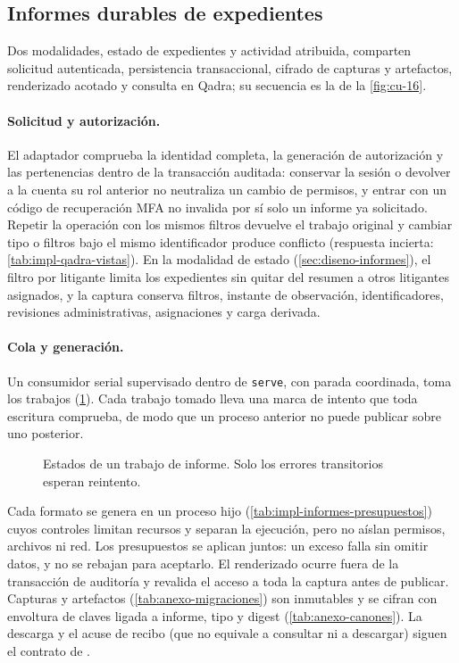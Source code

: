 \subsection{Informes durables de expedientes}\label{sec:impl-informes}

Dos modalidades, estado de expedientes y actividad atribuida, comparten
solicitud autenticada, persistencia transaccional, cifrado de capturas y
artefactos, renderizado acotado y consulta en Qadra; su secuencia es la de la
\cref{fig:cu-16}.

\paragraph{Solicitud y autorización.} El adaptador comprueba la identidad
completa, la generación de autorización y las pertenencias dentro de la
transacción auditada: conservar la sesión o devolver a la cuenta su rol anterior
no neutraliza un cambio de permisos, y entrar con un código de recuperación
MFA no invalida por sí solo un informe ya solicitado. Repetir la operación
con los mismos filtros devuelve el trabajo original y cambiar tipo o filtros
bajo el mismo identificador produce conflicto (respuesta incierta: \cref{tab:impl-qadra-vistas}). En la modalidad de estado
(\cref{sec:diseno-informes}), el filtro por litigante limita los expedientes sin
quitar del resumen a otros litigantes asignados, y la captura conserva filtros,
instante de observación, identificadores, revisiones administrativas,
asignaciones y carga derivada.

\paragraph{Cola y generación.} Un consumidor serial supervisado dentro de
\texttt{serve}, con parada coordinada, toma los trabajos
(\cref{fig:impl-informe-estados}). Cada trabajo tomado lleva una marca de
intento que toda escritura comprueba, de modo que un proceso anterior no puede
publicar sobre uno posterior.

\begin{figure}[t]
  \centering
  
  \caption{Estados de un trabajo de informe. Solo los errores transitorios esperan reintento.}
  \label{fig:impl-informe-estados}
\end{figure}

Cada formato se genera en un proceso hijo
(\cref{tab:impl-informes-presupuestos}) cuyos controles limitan recursos y
separan la ejecución, pero no aíslan permisos, archivos ni red. Los presupuestos
se aplican juntos: un exceso falla sin omitir datos, y no se rebajan para
aceptarlo. El renderizado ocurre fuera de la transacción de auditoría y revalida
el acceso a toda la captura antes de publicar. Capturas y artefactos
(\cref{tab:anexo-migraciones}) son inmutables y se cifran con envoltura de
claves ligada a informe, tipo y digest (\cref{tab:anexo-canones}). La descarga
y el acuse de recibo (que no equivale a consultar ni a descargar) siguen el
contrato de .


